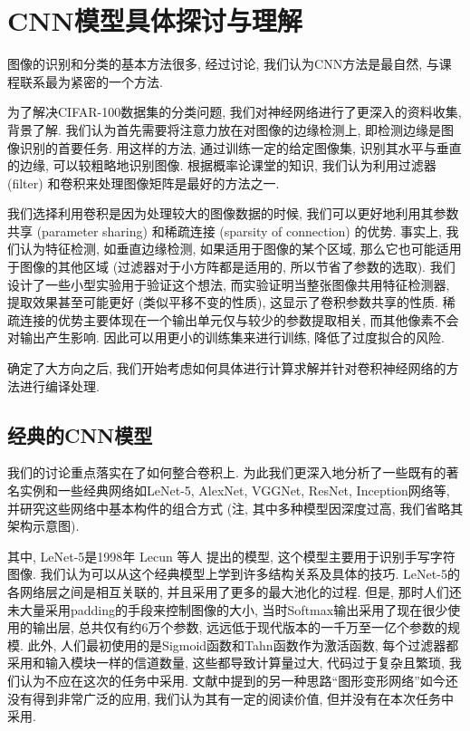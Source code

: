 \documentclass[lang=cn, 11pt,   a4paper]{elegantpaper}
\begin{document}
\section{CNN模型具体探讨与理解}
图像的识别和分类的基本方法很多, 经过讨论, 我们认为CNN方法是最自然, 与课程联系最为紧密的一个方法.

为了解决CIFAR-100数据集的分类问题, 我们对神经网络进行了更深入的资料收集, 背景了解. 我们认为首先需要将注意力放在对图像的边缘检测上, 即检测边缘是图像识别的首要任务. 用这样的方法, 通过训练一定的给定图像集, 识别其水平与垂直的边缘, 可以较粗略地识别图像. 根据概率论课堂的知识, 我们认为利用过滤器 (filter) 和卷积来处理图像矩阵是最好的方法之一. 

我们选择利用卷积是因为处理较大的图像数据的时候, 我们可以更好地利用其参数共享 (parameter sharing) 和稀疏连接 (sparsity of connection) 的优势.  事实上, 我们认为特征检测, 如垂直边缘检测, 如果适用于图像的某个区域, 那么它也可能适用于图像的其他区域 (过滤器对于小方阵都是适用的, 所以节省了参数的选取). 我们设计了一些小型实验用于验证这个想法, 而实验证明当整张图像共用特征检测器, 提取效果甚至可能更好 (类似平移不变的性质), 这显示了卷积参数共享的性质. 稀疏连接的优势主要体现在一个输出单元仅与较少的参数提取相关, 而其他像素不会对输出产生影响. 因此可以用更小的训练集来进行训练, 降低了过度拟合的风险.
 
确定了大方向之后, 我们开始考虑如何具体进行计算求解并针对卷积神经网络的方法进行编译处理. 

\subsection{经典的CNN模型}
我们的讨论重点落实在了如何整合卷积上. 为此我们更深入地分析了一些既有的著名实例和一些经典网络如LeNet-5, AlexNet, VGGNet, ResNet, Inception网络等, 并研究这些网络中基本构件的组合方式 (注, 其中多种模型因深度过高, 我们省略其架构示意图).

其中, LeNet-5是1998年 Lecun 等人 \cite{lecun98} 提出的模型, 这个模型主要用于识别手写字符图像. 我们认为可以从这个经典模型上学到许多结构关系及具体的技巧. LeNet-5的各网络层之间是相互关联的, 并且采用了更多的最大池化的过程. 但是, 那时人们还未大量采用padding的手段来控制图像的大小, 当时Softmax输出采用了现在很少使用的输出层, 总共仅有约6万个参数, 远远低于现代版本的一千万至一亿个参数的规模. 此外, 人们最初使用的是Sigmoid函数和Tahn函数作为激活函数, 每个过滤器都采用和输入模块一样的信道数量, 这些都导致计算量过大, 代码过于复杂且繁琐, 我们认为不应在这次的任务中采用. 文献中提到的另一种思路“图形变形网络”如今还没有得到非常广泛的应用, 我们认为其有一定的阅读价值, 但并没有在本次任务中采用. 
\end{document}
